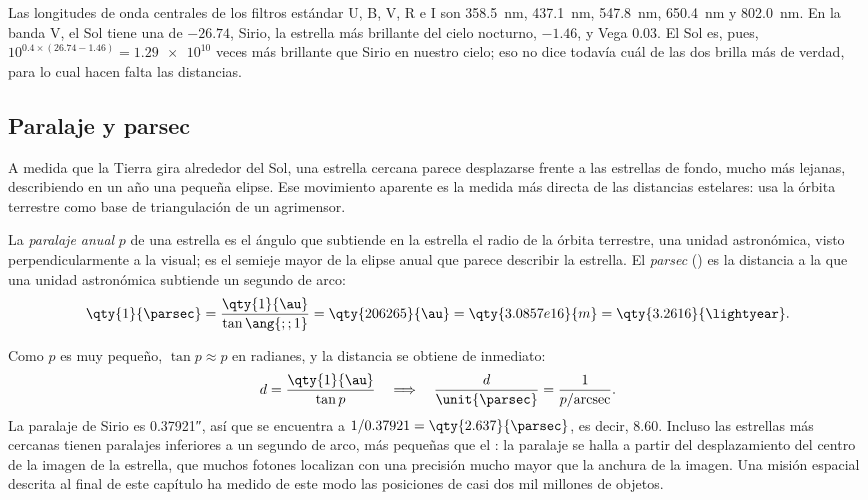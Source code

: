 Las longitudes de onda centrales de los filtros estándar U, B, V, R e I son
\qty{358.5}{nm}, \qty{437.1}{nm}, \qty{547.8}{nm}, \qty{650.4}{nm} y
\qty{802.0}{nm}.
En la banda V, el Sol tiene una  de $-26.74$, Sirio, la estrella más
brillante del cielo nocturno, $-1.46$, y Vega $0.03$. El Sol es, pues,
$10^{0.4\times(26.74 - 1.46)} = \num{1.29e10}$ veces más brillante que Sirio en nuestro
cielo; eso no dice todavía cuál de las dos brilla más de verdad, para lo cual hacen falta
las distancias.

\subsection*{Paralaje y parsec}

A medida que la Tierra gira alrededor del Sol, una estrella cercana parece desplazarse
frente a las estrellas de fondo, mucho más lejanas, describiendo en un año una pequeña
elipse. Ese movimiento aparente es la medida más directa de las distancias estelares: usa
la órbita terrestre como base de triangulación de un agrimensor.

\begin{definition}\label{def:b1:observing-the-sky:parallax}
La \emph{paralaje anual} $p$ de una estrella es el ángulo que
subtiende en la estrella el radio de la órbita terrestre, una unidad astronómica, visto
perpendicularmente a la visual; es el semieje mayor de
la elipse anual que parece describir la estrella. El \emph{parsec}
(\unit{\parsec}) es la distancia a la que una unidad astronómica subtiende un segundo
de arco:
\[
  \qty{1}{\parsec} = \frac{\qty{1}{\au}}{\tan\ang{;;1}} = \qty{206265}{\au}
  = \qty{3.0857e16}{m} = \qty{3.2616}{\lightyear} .
\]
\end{definition}

Como $p$ es muy pequeño, $\tan p \approx p$ en radianes, y la distancia se obtiene de
inmediato:
\[
  d = \frac{\qty{1}{\au}}{\tan p} \quad\Longrightarrow\quad
  \frac{d}{\unit{\parsec}} = \frac{1}{p/\text{arcsec}} .
\]
La paralaje de Sirio es \ang{;;0.37921}, así que se encuentra a $1/0.37921 =
\qty{2.637}{\parsec}$, es decir, \qty{8.60}{\lightyear}. Incluso las estrellas más
cercanas tienen paralajes inferiores a un segundo de arco, más pequeñas que el : la
paralaje se halla a partir del desplazamiento del centro de la imagen de la estrella, que
muchos fotones localizan con una precisión mucho mayor que la anchura de la imagen. Una
misión espacial descrita al final de este capítulo ha medido de este modo las posiciones
de casi dos mil millones de objetos.

